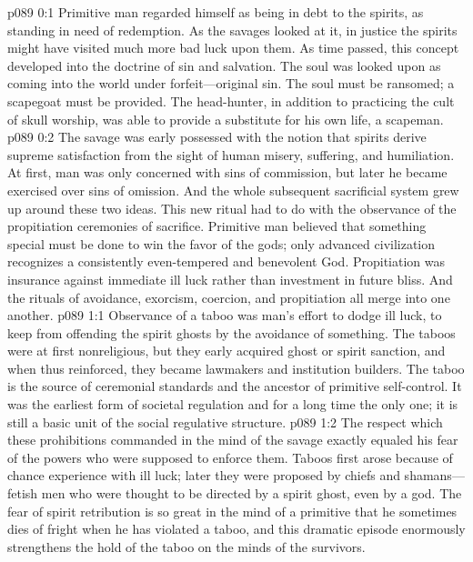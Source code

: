 \author{Brilliant Evening Star}
\vs p089 0:1 Primitive man regarded himself as being in debt to the spirits, as standing in need of redemption. As the savages looked at it, in justice the spirits might have visited much more bad luck upon them. As time passed, this concept developed into the doctrine of sin and salvation. The soul was looked upon as coming into the world under forfeit---original sin. The soul must be ransomed; a scapegoat must be provided. The head\hyp{}hunter, in addition to practicing the cult of skull worship, was able to provide a substitute for his own life, a scapeman.
\vs p089 0:2 The savage was early possessed with the notion that spirits derive supreme satisfaction from the sight of human misery, suffering, and humiliation. At first, man was only concerned with sins of commission, but later he became exercised over sins of omission. And the whole subsequent sacrificial system grew up around these two ideas. This new ritual had to do with the observance of the propitiation ceremonies of sacrifice. Primitive man believed that something special must be done to win the favor of the gods; only advanced civilization recognizes a consistently even\hyp{}tempered and benevolent God. Propitiation was insurance against immediate ill luck rather than investment in future bliss. And the rituals of avoidance, exorcism, coercion, and propitiation all merge into one another.\plusone
{}
\vs p089 1:1 Observance of a taboo was man’s effort to dodge ill luck, to keep from offending the spirit ghosts by the avoidance of something. The taboos were at first nonreligious, but they early acquired ghost or spirit sanction, and when thus reinforced, they became lawmakers and institution builders. The taboo is the source of ceremonial standards and the ancestor of primitive self\hyp{}control. It was the earliest form of societal regulation and for a long time the only one; it is still a basic unit of the social regulative structure.
\vs p089 1:2 The respect which these prohibitions commanded in the mind of the savage exactly equaled his fear of the powers who were supposed to enforce them. Taboos first arose because of chance experience with ill luck; later they were proposed by chiefs and shamans---fetish men who were thought to be directed by a spirit ghost, even by a god. The fear of spirit retribution is so great in the mind of a primitive that he sometimes dies of fright when he has violated a taboo, and this dramatic episode enormously strengthens the hold of the taboo on the minds of the survivors.
